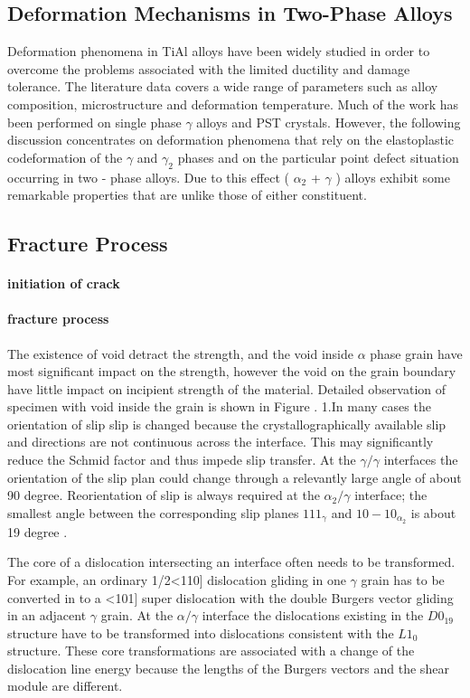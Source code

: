 \documentclass[final,5pt,times]{elsarticle}
\begin{document}
	\subsection{Deformation Mechanisms in Two-Phase Alloys}
	Deformation phenomena in TiAl alloys have been widely studied in order to overcome the problems associated with the limited ductility and damage tolerance. The literature data covers a wide range of parameters such as alloy composition, microstructure and deformation temperature. Much of the work has been performed on single phase $\gamma$ alloys and PST crystals. However, the following discussion concentrates on deformation phenomena that rely on the elastoplastic codeformation of the $\gamma$ and $\gamma_2$ phases and on the particular point defect situation occurring in two - phase alloys. Due to this effect ( $\alpha_2$ + $\gamma$ ) alloys exhibit some remarkable properties that are unlike those of either constituent.
	
	\subsection{Fracture Process}
	\paragraph{initiation of crack}
	\paragraph{fracture process}
	The existence of void detract the strength, and the void inside $\alpha$ phase grain have most significant  impact on the strength, however the void on the grain boundary have little impact on incipient strength of the material. Detailed observation of specimen with void inside the grain is shown in Figure \cite{}.
	1.In many cases the orientation of slip slip is changed because the crystallographically available slip and directions are not continuous across the interface. This may significantly reduce the Schmid factor and thus impede slip transfer. At the $\gamma/\gamma$ interfaces the orientation of the slip plan could change through a relevantly large angle of about 90 degree. Reorientation of slip is always required at the $\alpha_{2}/\gamma$ interface; the smallest angle between the corresponding slip planes ${1 1 1 }_{\gamma}$ and ${ 1 0 -1 0}_{\alpha_2}$ is about 19 degree \cite{}.
	
	The core of  a dislocation intersecting an interface often needs to be transformed. For example, an ordinary 1/2<110] dislocation gliding in one $\gamma$ grain has to be converted in to a <101] super dislocation with the double Burgers vector gliding in an adjacent $\gamma$ grain. At the $\alpha/\gamma$ interface the dislocations existing in the $D0_{19}$ structure have to be transformed into dislocations consistent with the $L1_0$structure. These core transformations are associated with a change of the dislocation line energy because the lengths of the Burgers vectors and the shear module are different.
	
\end{document}

